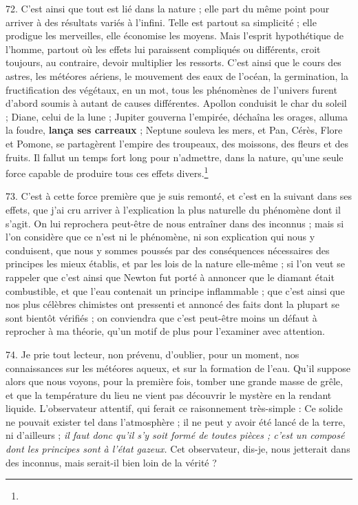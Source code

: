 \documentclass[a4paper, 11pt, oneside, polutonikogreek, french]{article}
\begin{document}
72. C'est ainsi que tout est lié dans la nature ; elle part du même point pour arriver à des résultats variés à l'infini. \og Telle est partout sa simplicité ; elle prodigue les merveilles, elle économise les moyens. Mais l'esprit hypothétique de l'homme, partout où les effets lui paraissent compliqués ou différents, croit toujours, au contraire, devoir multiplier les ressorts. C'est ainsi que le cours des astres, les météores aériens, le mouvement des eaux de l'océan, la germination, la fructification des végétaux, en un mot, tous les phénomènes de l'univers furent d'abord soumis à autant de causes différentes. Apollon conduisit le char du soleil ; Diane, celui de la lune ; Jupiter gouverna l'empirée, déchaîna les orages, alluma la foudre, \textbf{lança ses carreaux} ; Neptune souleva les mers, et Pan, Cérès, Flore et Pomone, se partagèrent l'empire des troupeaux, des moissons, des fleurs et des fruits. Il fallut un temps fort long pour n'admettre, dans la nature, qu'une seule force capable de produire tous ces effets divers.\footnote{} \fg

73. C'est à cette force première que je suis remonté, et c'est en la suivant dans ses effets, que j'ai cru arriver à l'explication la plus naturelle du phénomène dont il s'agit. On lui reprochera peut-être de nous entraîner dans des inconnus ; mais si l'on considère que ce n'est ni le phénomène, ni son explication qui nous y conduisent, que nous y sommes poussés par des conséquences nécessaires des principes les mieux établis, et par les lois de la nature elle-même ; si l'on veut se rappeler que c'est ainsi que Newton fut porté à annoncer que le diamant était combustible, et que l'eau contenait un principe inflammable ; que c'est ainsi que nos plus célèbres chimistes ont pressenti et annoncé des faits dont la plupart se sont bientôt vérifiés ; on conviendra que c'est peut-être moins un défaut à reprocher à ma théorie, qu'un motif de plus pour l'examiner avec attention.

74. Je prie tout lecteur, non prévenu, d'oublier, pour un moment, nos connaissances sur les météores aqueux, et sur la formation de l'eau. Qu'il suppose alors que nous voyons, pour la première fois, tomber une grande masse de grêle, et que la température du lieu ne vient pas découvrir le mystère en la rendant liquide. L'observateur attentif, qui ferait ce raisonnement très-simple : \og Ce solide ne pouvait exister tel dans l'atmosphère ; il ne peut y avoir été lancé de la terre, ni d'ailleurs ; \emph{il faut donc qu'il s'y soit formé de toutes pièces ; c'est un composé dont les principes sont à l'état gazeux.} \fg Cet observateur, dis-je, nous jetterait dans des inconnus, mais serait-il bien loin de la vérité ?
\end{document}
